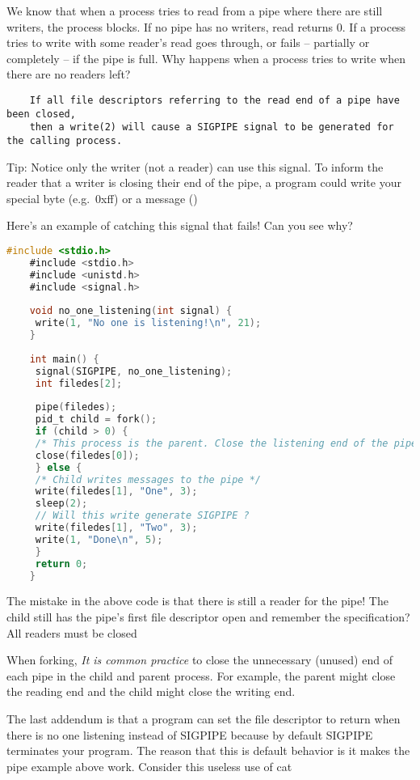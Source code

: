 We know that when a process tries to read from a pipe where there are still writers, the process blocks.
If no pipe has no writers, read returns 0.
If a process tries to write with some reader's read goes through, or fails -- partially or completely -- if the pipe is full.
Why happens when a process tries to write when there are no readers left?
	 
\begin{verbatim}
	If all file descriptors referring to the read end of a pipe have been closed,
	then a write(2) will cause a SIGPIPE signal to be generated for the calling process.
\end{verbatim}
	 
Tip: Notice only the writer (not a reader) can use this signal.
To inform the reader that a writer is closing their end of the pipe, a program could write your special byte (e.g.~0xff) or a message ()
	 
Here's an example of catching this signal that fails! Can you see why?
	 
\begin{lstlisting}[language=C]
	#include <stdio.h>
	#include <stdio.h>
	#include <unistd.h>
	#include <signal.h>
	 
	void no_one_listening(int signal) {
	 write(1, "No one is listening!\n", 21);
	}
	 
	int main() {
	 signal(SIGPIPE, no_one_listening);
	 int filedes[2];
	 
	 pipe(filedes);
	 pid_t child = fork();
	 if (child > 0) {
	 /* This process is the parent. Close the listening end of the pipe */
	 close(filedes[0]);
	 } else {
	 /* Child writes messages to the pipe */
	 write(filedes[1], "One", 3);
	 sleep(2);
	 // Will this write generate SIGPIPE ?
	 write(filedes[1], "Two", 3);
	 write(1, "Done\n", 5);
	 }
	 return 0;
	}
\end{lstlisting}
	 
The mistake in the above code is that there is still a reader for the pipe!
The child still has the pipe's first file descriptor open and remember the specification? All readers must be closed
	 
When forking, \emph{It is common practice} to close the unnecessary (unused) end of each pipe in the child and parent process.
For example, the parent might close the reading end and the child might close the writing end.
	 
The last addendum is that a program can set the file descriptor to return when there is no one listening instead of SIGPIPE because by default SIGPIPE terminates your program.
The reason that this is default behavior is it makes the pipe example above work.
Consider this useless use of cat
	 
